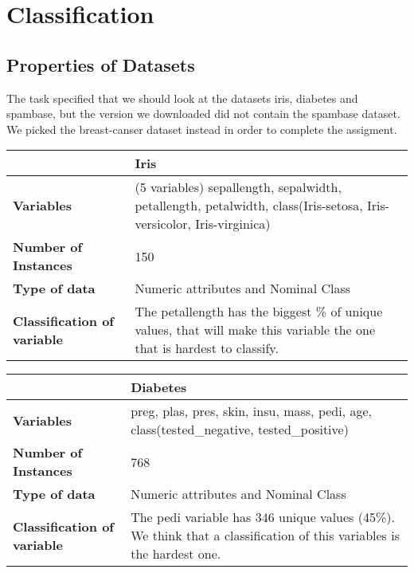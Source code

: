 \section{Classification}

	\subsection*{Properties of Datasets}
	The task specified that we should look at the datasets iris, diabetes and spambase, 
	but the version we downloaded did not contain the spambase dataset.
	We picked the breast-canser dataset instead in order to complete the assigment. 

	\begin{table}[H]
		\begin{tabular}{ p{4cm} | p{8cm} }
			\hline
			\rowcolor{gray}
			 & {\bf Iris} \\ \hline
			{\bf Variables} & (5 variables)
			sepallength, sepalwidth, petallength, petalwidth, 
			class(Iris-setosa, Iris-versicolor, Iris-virginica) \\ \hline
			{\bf Number of Instances} & 150 \\ \hline
			{\bf Type of data} & Numeric attributes and Nominal Class\\ \hline
			{\bf Classification of variable} & The petallength has the biggest \% of unique 
			values, that will make this variable the one that is hardest to classify. \\ \hline
		\end{tabular}

		\begin{tabular}{ p{4cm} | p{8cm} }
			\hline
			\rowcolor{gray}
			 & {\bf Diabetes} \\ \hline
			{\bf Variables} & preg, plas, pres, skin, insu, mass, pedi, age, 
			class(tested\_negative, tested\_positive)	\\ \hline
			{\bf Number of Instances} & 768 \\ \hline
			{\bf Type of data} & Numeric attributes and Nominal Class \\ \hline
			{\bf Classification of variable} & The pedi variable has 346 unique values (45\%).
			We think that a classification of this variables is the hardest one. \\ \hline
		\end{tabular}


\end{table}
